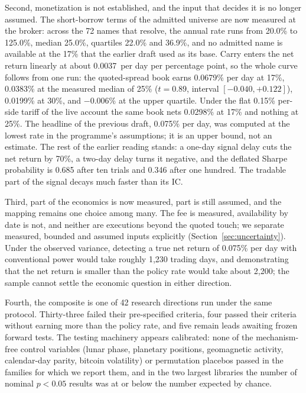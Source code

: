 Second, monetization is not established, and the input that decides it is no longer assumed. The short-borrow terms of the admitted universe are now measured at the broker: across the 72 names that resolve, the annual rate runs from 20.0\% to 125.0\%, median 25.0\%, quartiles 22.0\% and 36.9\%, and no admitted name is available at the 17\% that the earlier draft used as its base. Carry enters the net return linearly at about 0.0037\pp\ per day per percentage point, so the whole curve follows from one run: the quoted-spread book earns 0.0679\% per day at 17\%, 0.0383\% at the measured median of 25\% ($t=0.89$, interval $[-0.040,+0.122]$), 0.0199\% at 30\%, and $-0.006$\% at the upper quartile. Under the flat 0.15\% per-side tariff of the live account the same book nets 0.0298\% at 17\% and nothing at 25\%. The headline of the previous draft, 0.075\% per day, was computed at the lowest rate in the programme's assumptions; it is an upper bound, not an estimate. The rest of the earlier reading stands: a one-day signal delay cuts the net return by 70\%, a two-day delay turns it negative, and the deflated Sharpe probability \citep{bailey2014dsr} is 0.685 after ten trials and 0.346 after one hundred. The tradable part of the signal decays much faster than its IC.

Third, part of the economics is now measured, part is still assumed, and the mapping remains one choice among many. The fee is measured, availability by date is not, and neither are executions beyond the quoted touch; we separate measured, bounded and assumed inputs explicitly (Section~\ref{sec:uncertainty}). Under the observed variance, detecting a true net return of 0.075\% per day with conventional power would take roughly 1,230 trading days, and demonstrating that the net return is smaller than the policy rate would take about 2,200; the sample cannot settle the economic question in either direction.

Fourth, the composite is one of 42 research directions run under the same protocol. Thirty-three failed their pre-specified criteria, four passed their criteria without earning more than the policy rate, and five remain leads awaiting frozen forward tests. The testing machinery appears calibrated: none of the mechanism-free control variables (lunar phase, planetary positions, geomagnetic activity, calendar-day parity, bitcoin volatility) or permutation placebos passed in the families for which we report them, and in the two largest libraries the number of nominal $p<0.05$ results was at or below the number expected by chance.

